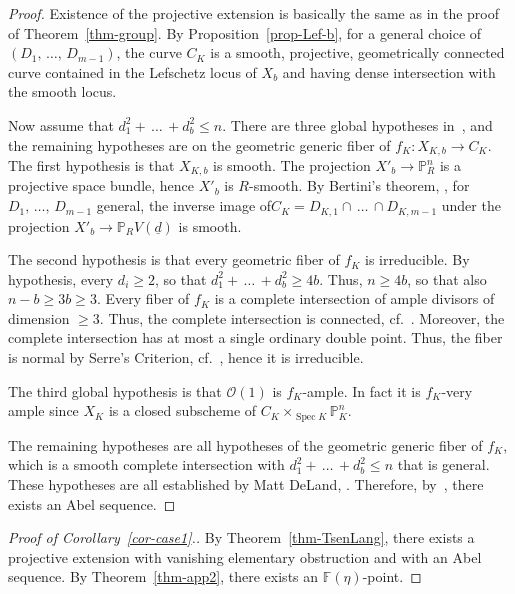 \documentclass[11pt]{article}
\theoremstyle{definition}
\numberwithin{equation}{section}
\numberwithin{figure}{section}
\numberwithin{table}{section}
\newcommand{\mbb}{\mathbb}
\newcommand{\PP}{\mbb{P}}
\newcommand{\FF}{\mbb{F}}
\newcommand{\mc}{\mathcal}
\newcommand{\OO}{\mc{O}}
\newcommand{\ul}{\underline}
\newcommand{\Xx}{X}
\newcommand{\Cc}{C}
\newcommand{\FR}{K}
\newcommand{\cb}{b}
\DeclareMathOperator{\SP}{Spec}
\newcommand*{\MK}{\mkern 2mu}
\begin{document}
\begin{proof}
Existence of the projective extension is basically the same as in the proof of Theorem~\ref{thm-group}. By Proposition~\ref{prop-Lef-b}, for a general choice of $(D_1,\,\dots,\,D_{m-1})$, the curve $\Cc_\FR$ is a smooth, projective, geometrically connected curve contained in the Lefschetz locus of $\Xx_\cb$ and having dense intersection with the smooth locus.

Now assume that $d_1^2 +\,\dots\,+ d_\cb^2\leq n$. There are three global hypotheses in~\cite[Theorem~13.1]{dJHS}, and the remaining hypotheses are on the geometric generic fiber of $f_\FR:\Xx_{\FR,\cb} \to \Cc_\FR$. The first hypothesis is that $\Xx_{\FR,\cb}$ is smooth. The projection $\Xx'_{\cb} \to \PP^n_R$ is a projective space bundle, hence $\Xx'_\cb$ is $R$-smooth. By Bertini's theorem, \cite[Théorème~6.3$\MK$(2)]{Jou}, for $D_1,\,\dots,\,D_{m-1}$ general, the inverse image of\linebreak$\Cc_\FR = D_{\FR,1}\cap\,\dots\,\cap D_{\FR,m-1}$ under the projection $\Xx'_\cb \to \PP_R V(\ul{d})$ is smooth.

The second hypothesis is that every geometric fiber of $f_\FR$ is irreducible. By hypothesis, every $d_i\geq 2$, so that $d_1^2 +\,\dots\,+ d_\cb^2
\geq 4\cb$. Thus, $n\geq 4\cb$, so that also $n-\cb \geq 3\cb \geq 3$. Every fiber of $f_\FR$ is a complete intersection of ample divisors of dimension $\geq 3$. Thus, the complete intersection is connected, cf.~\cite[Corollary~XII.3.5]{SGA1}. Moreover, the complete intersection has at most a single ordinary double point. Thus, the fiber is normal by Serre's Criterion, cf.~\cite[XI.3.11]{SGA1}, hence it is irreducible.

The third global hypothesis is that $\OO(1)$ is $f_\FR$-ample. In fact it is $f_\FR$-very ample since $\Xx_\FR$ is a closed subscheme of $\Cc_\FR \times_{\SP \FR} \PP^n_\FR$.

The remaining hypotheses are all hypotheses of the geometric generic fiber of $f_\FR$, which is a smooth complete intersection with $d_1^2 +\,
\dots\,+ d_\cb^2 \leq n$ that is general. These hypotheses are all established by Matt DeLand, \cite{DeLand}. Therefore, by~\cite[Theorem~13.1]{dJHS}, there exists an Abel sequence.
\end{proof}

\begin{proof}[Proof of Corollary~\ref{cor-case1}.]
By Theorem~\ref{thm-TsenLang}, there exists a projective extension with vanishing elementary obstruction and with an Abel sequence. By Theorem~\ref{thm-app2}, there exists an $\FF(\eta)$-point.
\end{proof}
\end{document}
